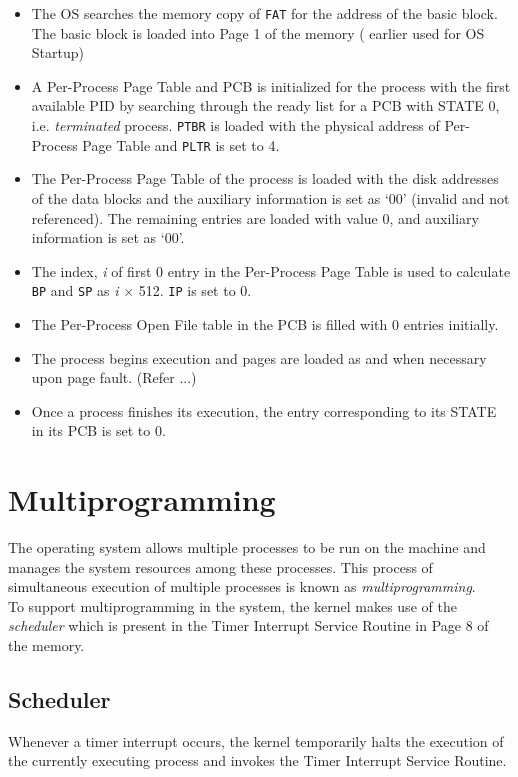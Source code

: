 \documentclass[10pt]{report}
\begin{document}
\begin{itemize}
	\item The OS searches the memory copy of \texttt{FAT} for the address of the basic block. The basic block is loaded into Page 1 of the memory ( earlier used for OS Startup)
	\item A Per-Process Page Table and  PCB is initialized for the process with the first available PID by searching through the ready list for a PCB with STATE 0, i.e. \textit{terminated} process. \texttt{PTBR} is loaded with the physical address of Per-Process Page Table and \texttt{PLTR} is set to 4.
	\item The Per-Process Page Table of the process is loaded with the disk addresses of the data blocks and the auxiliary information is set as `00'  (invalid and not referenced). The remaining entries are loaded with value 0, and auxiliary information is set as `00'. 
	\item The index, \textit{i} of first 0 entry in the Per-Process Page Table is used to calculate \texttt{BP} and \texttt{SP} as \textit{i} $\times$ 512. \texttt{IP} is set to 0. 
	\item The Per-Process Open File table in the PCB is filled with 0 entries initially.
	\item The process begins execution and pages are loaded as and when necessary upon page fault. (Refer ...)
	\item Once a process finishes its execution, the entry corresponding to its STATE in its PCB is set to 0.

\end{itemize}

\section{Multiprogramming}
	
The operating system allows multiple processes to be run on the machine and manages the system resources among these processes. This process of simultaneous execution of multiple processes is known as \emph{multiprogramming}.  \\

To support multiprogramming in the system, the kernel makes use of the \emph{scheduler} which is present in the Timer Interrupt Service Routine in Page 8 of the memory.

\subsection{Scheduler}
\label{chp:scheduler}
Whenever a timer interrupt occurs, the kernel temporarily halts the execution of the currently executing process and invokes the Timer Interrupt Service Routine.
\end{document}
